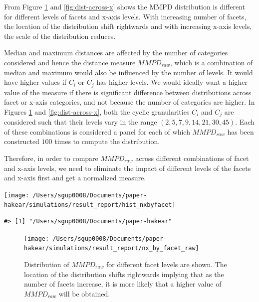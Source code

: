\documentclass[
]{article}
\begin{document}
From Figure \ref{fig:dist-across-facets} and \ref{fig:dist-across-x} shows the MMPD distribution is different for different levels of facets and x-axis levels. With increasing number of facets, the location of the distribution shift rightwards and with increasing x-axis levels, the scale of the distribution reduces.

Median and maximum distances are affected by the number of categories considered and hence the distance measure \(MMPD_{raw}\), which is a combination of median and maximum would also be influenced by the number of levels. It would have higher values if \(C_i\) or \(C_j\) has higher levels. We would ideally want a higher value of the measure if there is significant difference between distributions across facet or x-axis categories, and not because the number of categories are higher. In Figures \ref{fig:dist-across-facets} and \ref{fig:dist-across-x}, both the cyclic granularities \(C_i\) and \(C_j\) are considered such that their levels vary in the range \((2, 5,7 ,9, 14, 21, 30, 45)\). Each of these combinations is considered a panel for each of which \(MMPD_{raw}\) has been constructed \(100\) times to compute the distribution.

Therefore, in order to compare \(MMPD_{raw}\) across different combinations of facet and x-axis levels, we need to eliminate the impact of different levels of the facets and x-axis first and get a normalized measure.

\begin{center}\texttt{[image: /Users/sgup0008/Documents/paper-hakear/simulations/result\_report/hist\_nxbyfacet]} \end{center}

\begin{verbatim}
#> [1] "/Users/sgup0008/Documents/paper-hakear"
\end{verbatim}

\begin{figure}

{\centering \texttt{[image: /Users/sgup0008/Documents/paper-hakear/simulations/result\_report/nx\_by\_facet\_raw]} 

}

\caption{Distribution of $MMPD_{raw}$ for different facet levels are shown. The location of the distribution shifts rightwards implying that as the number of facets increase, it is more likely that a higher value of $MMPD_{raw}$ will be obtained.}\label{fig:dist-across-facets}
\end{figure}
\end{document}
